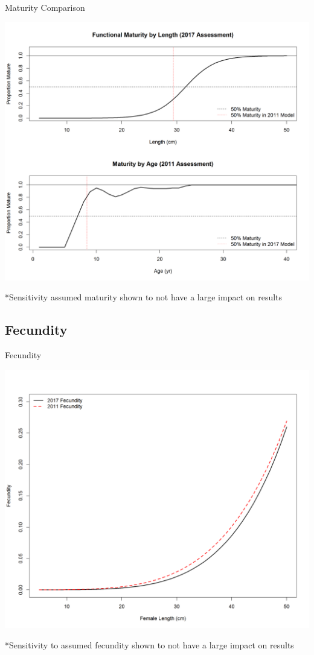 \documentclass[pdf]{beamer}\usepackage[]{graphicx}\usepackage[]{color}
\begin{document}
\begin{frame}{Maturity Comparison}
  \begin{center}
    \includegraphics[scale = 0.32, trim={0, 0, 1cm, 1cm}, clip]{figures/Maturity_Comparison.png}
  \end{center}
  *Sensitivity assumed maturity shown to not have a large impact on results
\end{frame}

\subsection{Fecundity}
\begin{frame}{Fecundity}
  \begin{center}
    \includegraphics[scale = 0.3, trim={0, 0, 1cm, 1cm}, clip]{figures/Fecundity_Comparison.png}
  \end{center}
  *Sensitivity to assumed fecundity shown to not have a large impact on results
\end{frame}
\end{document}
